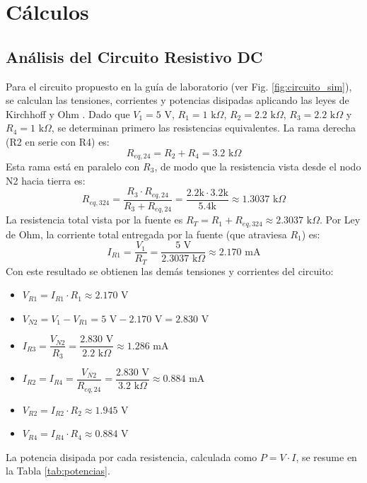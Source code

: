 \documentclass[journal, a4paper]{IEEEtran}
\begin{document}
\section{Cálculos}

\subsection{Análisis del Circuito Resistivo DC}
Para el circuito propuesto en la guía de laboratorio (ver Fig. \ref{fig:circuito_sim}), se calculan las tensiones, corrientes y potencias disipadas aplicando las leyes de Kirchhoff y Ohm \cite{sedra2020}. Dado que $V_1 = 5\text{ V}$, $R_1=1\text{ k}\Omega$, $R_2=2.2\text{ k}\Omega$, $R_3=2.2\text{ k}\Omega$ y $R_4=1\text{ k}\Omega$, se determinan primero las resistencias equivalentes. La rama derecha (R2 en serie con R4) es:
\begin{equation}
    R_{eq,24} = R_2 + R_4 = 3.2\text{ k}\Omega
\end{equation}
Esta rama está en paralelo con $R_3$, de modo que la resistencia vista desde el nodo N2 hacia tierra es:
\begin{equation}
    R_{eq,324} = \frac{R_3 \cdot R_{eq,24}}{R_3 + R_{eq,24}} = \frac{2.2\text{k} \cdot 3.2\text{k}}{5.4\text{k}} \approx 1.3037\text{ k}\Omega
\end{equation}
La resistencia total vista por la fuente es $R_T = R_1 + R_{eq,324} \approx 2.3037\text{ k}\Omega$. Por Ley de Ohm, la corriente total entregada por la fuente (que atraviesa $R_1$) es:
\begin{equation}
    I_{R1} = \frac{V_1}{R_T} = \frac{5\text{ V}}{2.3037\text{ k}\Omega} \approx 2.170\text{ mA}
\end{equation}
Con este resultado se obtienen las demás tensiones y corrientes del circuito:
\begin{itemize}
    \item $V_{R1} = I_{R1} \cdot R_1 \approx 2.170\text{ V}$
    \item $V_{N2} = V_1 - V_{R1} = 5\text{ V} - 2.170\text{ V} = 2.830\text{ V}$
    \item $I_{R3} = \dfrac{V_{N2}}{R_3} = \dfrac{2.830\text{ V}}{2.2\text{ k}\Omega} \approx 1.286\text{ mA}$
    \item $I_{R2} = I_{R4} = \dfrac{V_{N2}}{R_{eq,24}} = \dfrac{2.830\text{ V}}{3.2\text{ k}\Omega} \approx 0.884\text{ mA}$
    \item $V_{R2} = I_{R2} \cdot R_2 \approx 1.945\text{ V}$
    \item $V_{R4} = I_{R4} \cdot R_4 \approx 0.884\text{ V}$
\end{itemize}
La potencia disipada por cada resistencia, calculada como $P = V \cdot I$, se resume en la Tabla \ref{tab:potencias}.
\end{document}
